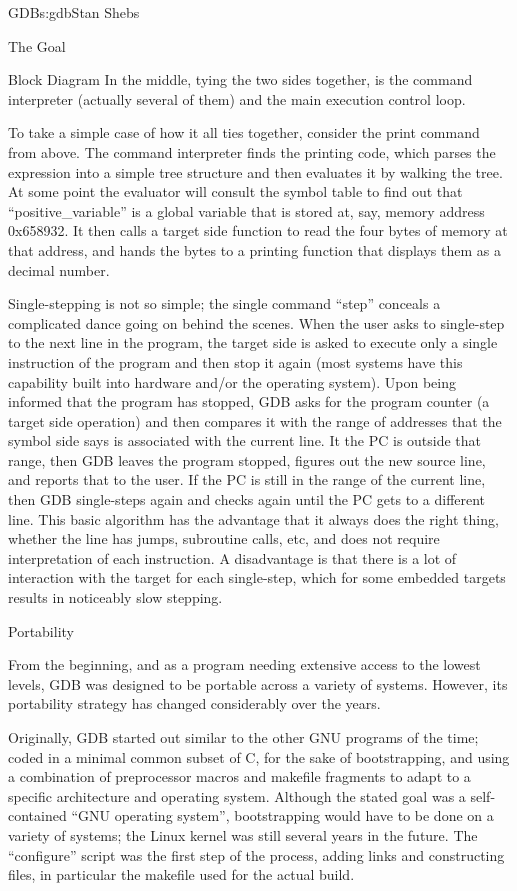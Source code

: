 \begin{aosachapter}{GDB}{s:gdb}{Stan Shebs}
\begin{aosasect1}{The Goal}
\begin{aosasect1}{Block Diagram}
In the middle, tying the two sides together, is the command
interpreter (actually several of them) and the main execution control
loop.

To take a simple case of how it all ties together, consider the print
command from above.  The command interpreter finds the printing code,
which parses the expression into a simple tree structure and then
evaluates it by walking the tree.  At some point the evaluator will
consult the symbol table to find out that ``positive_variable'' is a
global variable that is stored at, say, memory address 0x658932.  It
then calls a target side function to read the four bytes of memory at
that address, and hands the bytes to a printing function that displays
them as a decimal number.

Single-stepping is not so simple; the single command ``step'' conceals
a complicated dance going on behind the scenes.  When the user asks to
single-step to the next line in the program, the target side is asked
to execute only a single instruction of the program and then stop it
again (most systems have this capability built into hardware and/or
the operating system).  Upon being informed that the program has
stopped, GDB asks for the program counter (a target side operation)
and then compares it with the range of addresses that the symbol side
says is associated with the current line.  It the PC is outside that
range, then GDB leaves the program stopped, figures out the new source
line, and reports that to the user.  If the PC is still in the range
of the current line, then GDB single-steps again and checks again
until the PC gets to a different line.  This basic algorithm has the
advantage that it always does the right thing, whether the line has
jumps, subroutine calls, etc, and does not require interpretation of
each instruction.  A disadvantage is that there is a lot of
interaction with the target for each single-step, which for some
embedded targets results in noticeably slow stepping.

\end{aosasect1}

\begin{aosasect1}{Portability}

From the beginning, and as a program needing extensive access to the
lowest levels, GDB was designed to be portable across a variety of
systems.  However, its portability strategy has changed considerably
over the years.

Originally, GDB started out similar to the other GNU programs of the
time; coded in a minimal common subset of C, for the sake of
bootstrapping, and using a combination of preprocessor macros and
makefile fragments to adapt to a specific architecture and operating
system.  Although the stated goal was a self-contained ``GNU operating
system'', bootstrapping would have to be done on a variety of systems;
the Linux kernel was still several years in the future.  The
``configure'' script was the first step of the process, adding links
and constructing files, in particular the makefile used for the actual
build.


\end{aosasect1}
\end{aosasect1}
\end{aosachapter}
